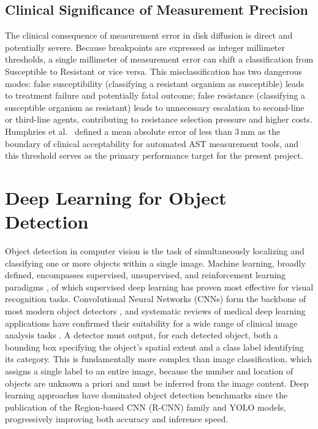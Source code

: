\subsection{Clinical Significance of Measurement Precision}

The clinical consequence of measurement error in disk diffusion is direct and potentially severe.
Because breakpoints are expressed as integer millimeter thresholds, a single millimeter of
measurement error can shift a classification from Susceptible to Resistant or vice versa. This
misclassification has two dangerous modes: false susceptibility (classifying a resistant organism
as susceptible) leads to treatment failure and potentially fatal outcome; false resistance
(classifying a susceptible organism as resistant) leads to unnecessary escalation to
second-line or third-line agents, contributing to resistance selection pressure and higher
costs. Humphries et al.\ \cite{humphries2018} defined a mean absolute error of less than
3\,mm as the boundary of clinical acceptability for automated AST measurement tools, and this
threshold serves as the primary performance target for the present project.

\section{Deep Learning for Object Detection}

Object detection in computer vision is the task of simultaneously localizing and classifying
one or more objects within a single image. Machine learning, broadly defined, encompasses
supervised, unsupervised, and reinforcement learning paradigms \cite{alam2023ml,murphy2025rl},
of which supervised deep learning has proven most effective for visual recognition tasks.
Convolutional Neural Networks (CNNs) form the backbone of most modern object detectors
\cite{purwono2023cnn}, and systematic reviews of medical deep learning applications have
confirmed their suitability for a wide range of clinical image analysis tasks \cite{egger2022}.
A detector must output, for each detected object, both a bounding box specifying the object's
spatial extent and a class label identifying its category. This is fundamentally more complex
than image classification, which assigns a single label to an entire image, because the number
and location of objects are unknown a priori and must be inferred from the image content.
Deep learning approaches have dominated object detection benchmarks since the publication of
the Region-based CNN (R-CNN) family and YOLO models, progressively improving both accuracy
and inference speed.

